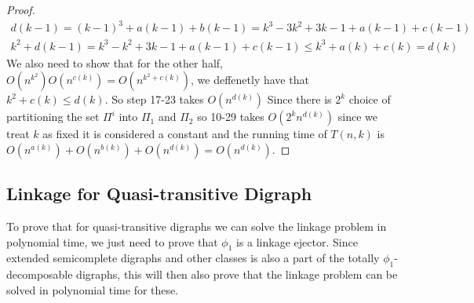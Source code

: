 \begin{proof}
    \begin{align}
        d(k-1)=(k-1)^3+a(k-1)+b(k-1)=k^3-3k^2+3k-1+a(k-1)+c(k-1)\\
        k^2+d(k-1)=k^3-k^2+3k-1+a(k-1)+c(k-1)\leq k^3+a(k)+c(k)=d(k)
    \end{align} 
    We also need to show that for the other half, $O(n^{k^2})O(n^{c(k)})=O(n^{k^2+c(k)})$, we deffenetly have that $k^2+c(k)\leq d(k)$.
    So step 17-23 takes $O(n^{d(k)})$
    Since there is $2^k$ choice of partitioning the set $\Pi^i$ into $\Pi_1$ and $\Pi_2$ so 10-29 takes $O(2^kn^{d(k)})$ since we treat $k$ as fixed it is considered a constant and the running time of $T(n,k)$ is $O(n^{a(k)})+O(n^{b(k)})+O(n^{d(k)})=O(n^{d(k)})$.
\end{proof}

\subsection{Linkage for Quasi-transitive Digraph}
To prove that for quasi-transitive digraphs we can solve the linkage problem in polynomial time, we just need to prove that $\phi_1$ is a linkage ejector. 
Since extended semicomplete digraphs and other classes is also a part of the totally $\phi_1$-decomposable digraphs, this will then also prove that the linkage problem can be solved in polynomial time for these.

